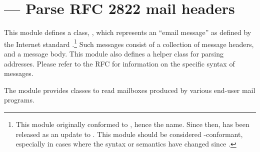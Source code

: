\section{ ---
         Parse RFC 2822 mail headers}



This module defines a class, , which represents an
``email message'' as defined by the Internet standard
.\footnote{This module originally conformed to ,
hence the name.  Since then,  has been released as an
update to .  This module should be considered
-conformant, especially in cases where the
syntax or semantics have changed since .}  Such messages
consist of a collection of message headers, and a message body.  This
module also defines a helper class
 for parsing  addresses.  Please refer to
the RFC for information on the specific syntax of  messages.

The  module provides classes 
to read mailboxes produced by various end-user mail programs.

